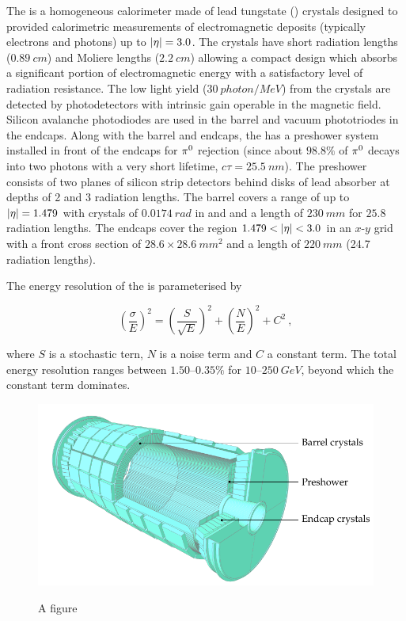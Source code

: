 The \ECAL is a homogeneous calorimeter made of lead tungstate (\pbwo) crystals
designed to provided calorimetric measurements of electromagnetic deposits
(typically electrons and photons) up to ${|\eta|=3.0}$. The crystals have
short radiation lengths (${\SI{0.89}{cm}}$) and Moliere lengths
(${\SI{2.2}{cm}}$) allowing a compact design which absorbs a significant
portion of electromagnetic energy with a satisfactory level of radiation
resistance. The low light yield (${\SI{30}{photon/MeV}}$) from the crystals are
detected by photodetectors with intrinsic gain operable in the magnetic field.
Silicon avalanche photodiodes are used in the barrel and vacuum phototriodes in
the endcaps. Along with the barrel and endcaps, the \ECAL has a preshower system
installed in front of the endcaps for ${\pi^{0}}$ rejection (since about
${98.8\%}$ of ${\pi^{0}}$ decays into two photons with a very short lifetime,
${c\tau=\SI{25.5}{nm}}$). The preshower consists of two planes of silicon strip
detectors behind disks of lead absorber at depths of 2 and 3 radiation lengths.
The barrel covers a range of up to ${|\eta|=1.479}$ with crystals of
${\SI{0.0174}{rad}}$ in \dphi and \deta and a length of ${\SI{230}{mm}}$ for
$25.8$ radiation lengths. The endcaps cover the region ${1.479<\aeta<3.0}$ in
an $x$-$y$ grid with a front cross section of ${28.6\times\SI{28.6}{mm^2}}$ and
a length of ${\SI{220}{mm}}$ (24.7 radiation lengths).

The energy resolution of the \ECAL is parameterised by

\begin{equation}
    \left(\frac{\sigma}{E}\right)^{2} = \left(\frac{S}{\sqrt{E}} \right)^{2}
    + \left( \frac{N}{E} \right)^{2} + C^2\ ,
\end{equation}

where $S$ is a stochastic tern, $N$ is a noise term and $C$ a constant term.
The total energy resolution ranges between {$1.50$--$0.35\%$} for
{$10$--$\SI{250}{GeV}$}, beyond which the constant term dominates.

\begin{figure}[htbp]
    \centering
    \includegraphics{diagrams/tikz/cms/annotated/cms_ecal.pdf}
    \label{fig:cms-ecal}
    \caption{
        A figure 
    }
\end{figure}

